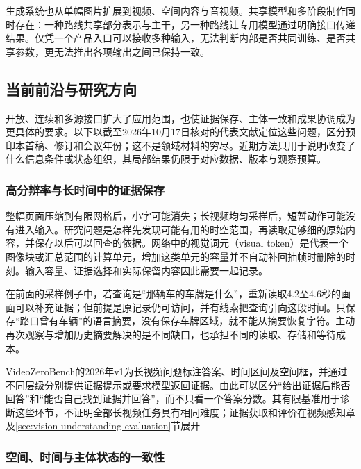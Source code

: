 生成系统也从单幅图片扩展到视频、空间内容与音视频。共享模型和多阶段制作同时存在：一种路线共享部分表示与主干，另一种路线让专用模型通过明确接口传递结果。仅凭一个产品入口可以接收多种输入，无法判断内部是否共同训练、是否共享参数，更无法推出各项输出之间已保持一致。

\subsection{当前前沿与研究方向}
\label{sec:vision-overview-frontiers}

开放、连续和多源接口扩大了应用范围，也使证据保存、主体一致和成果协调成为更具体的要求。以下以截至2026年10月17日核对的代表文献定位这些问题，区分预印本首稿、修订和会议年份；这不是领域材料的穷尽。近期方法只用于说明改变了什么信息条件或状态组织，其局部结果仍限于对应数据、版本与观察预算。

\subsubsection{高分辨率与长时间中的证据保存}
\label{sec:vision-overview-evidence-frontier}

整幅页面压缩到有限网格后，小字可能消失；长视频均匀采样后，短暂动作可能没有进入输入。研究问题是怎样先发现可能有用的时空范围，再读取足够细的原始内容，并保存以后可以回查的依据。网络中的视觉词元（visual token）是代表一个图像块或汇总范围的计算单元，增加这类单元的容量并不自动补回抽帧时删除的时刻。输入容量、证据选择和实际保留内容因此需要一起记录。

在前面的采样例子中，若查询是“那辆车的车牌是什么”，重新读取4.2至4.6秒的画面可以补充证据；但前提是原记录仍可访问，并有线索把查询引向这段时间。只保存“路口曾有车辆”的语言摘要，没有保存车牌区域，就不能从摘要恢复字符。主动再次观察与增加历史摘要解决的是不同缺口，也承担不同的读取、存储和等待成本。

VideoZeroBench的2026年v1为长视频问题标注答案、时间区间及空间框，并通过不同层级分别提供证据提示或要求模型返回证据。由此可以区分“给出证据后能否回答”和“能否自己找到证据并回答”，而不只看一个答案分数。其有限基准用于诊断这些环节，不证明全部长视频任务具有相同难度；证据获取和评价在视频感知章及\ref{sec:vision-understanding-evaluation}节展开

\subsubsection{空间、时间与主体状态的一致性}
\label{sec:vision-overview-consistency-frontier}

